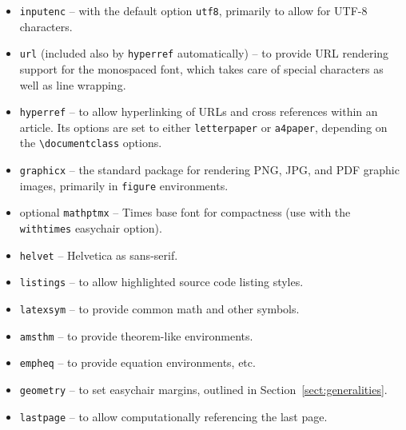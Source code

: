 \documentclass[]{easychair}
\newcommand{\easychair}{\textsf{easychair}}
\begin{document}
\begin{itemize}
\item
\texttt{inputenc} \cite{inputenc-package} -- with the default option
\texttt{utf8}, primarily to allow for UTF-8 characters.

\item
\texttt{url} \cite{url-package} (included also by \texttt{hyperref} automatically) -- to provide URL rendering support for the
monospaced font, which takes care of special characters as well as line 
wrapping.

\item
\texttt{hyperref} \cite{hyperref-package} -- to allow hyperlinking of URLs and
cross references within an article.
Its options are set to either \verb+letterpaper+ or \verb+a4paper+, depending
on the \verb+\documentclass+ options.

\item
\texttt{graphicx} \cite{graphicx-package} -- the standard package for rendering
PNG, JPG, and PDF graphic images, primarily in \texttt{figure} environments.

\item
optional \texttt{mathptmx} \cite{mathptmx-package} -- Times base font for compactness
(use with the \texttt{withtimes} {\easychair} option).

\item
\texttt{helvet} \cite{helvet-package} -- Helvetica as {\sf sans-serif}.

\item
\texttt{listings} \cite{listings-package} -- to allow highlighted source code 
listing styles.

\item
\texttt{latexsym} \cite{latexsym-package} -- to provide common math and other 
symbols.

\item
\texttt{amsthm} \cite{amsthm-package} -- to provide {\AmS} theorem-like 
environments.

\item
\texttt{empheq} \cite{empheq-package} -- to provide equation environments, etc.

\item
\texttt{geometry} \cite{geometry-package} -- to set {\easychair} margins, 
outlined in Section~\ref{sect:generalities}.

\item
\texttt{lastpage} \cite{lastpage-package} -- to allow computationally
referencing the last page.


\end{itemize}
\end{document}
